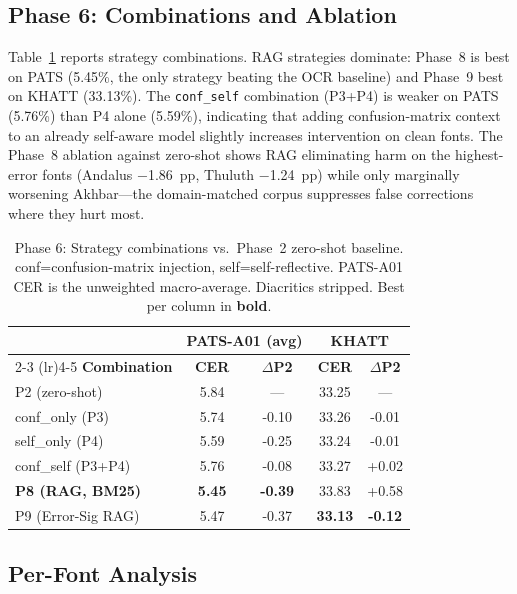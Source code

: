 \documentclass[conference]{IEEEtran}
\begin{document}
\subsection{Phase 6: Combinations and Ablation}

Table~\ref{tab:combos} reports strategy combinations. RAG strategies dominate:
Phase~8 is best on PATS (5.45\%, the only strategy beating the OCR baseline) and
Phase~9 best on KHATT (33.13\%). The \texttt{conf\_self} combination (P3+P4) is
weaker on PATS (5.76\%) than P4 alone (5.59\%), indicating that adding
confusion-matrix context to an already self-aware model slightly increases
intervention on clean fonts. The Phase~8 ablation against zero-shot shows RAG
eliminating harm on the highest-error fonts (Andalus $-$1.86~pp, Thuluth
$-$1.24~pp) while only marginally worsening Akhbar---the domain-matched corpus
suppresses false corrections where they hurt most.

\begin{table}[t]
\caption{Phase 6: Strategy combinations vs.\ Phase~2 zero-shot baseline.
conf=confusion-matrix injection, self=self-reflective. PATS-A01 CER is the
unweighted macro-average. Diacritics stripped. Best per column in \textbf{bold}.}
\label{tab:combos}
\begin{center}
\small
\begin{tabular}{lcccc}
\toprule
& \multicolumn{2}{c}{\textbf{PATS-A01 (avg)}} & \multicolumn{2}{c}{\textbf{KHATT}} \\
\cmidrule(lr){2-3} \cmidrule(lr){4-5}
\textbf{Combination} & \textbf{CER} & \textbf{$\Delta$P2} & \textbf{CER} & \textbf{$\Delta$P2} \\
\midrule
P2 (zero-shot)           & 5.84 & ---   & 33.25 & ---   \\
conf\_only (P3)          & 5.74 & -0.10 & 33.26 & -0.01 \\
self\_only (P4)          & 5.59 & -0.25 & 33.24 & -0.01 \\
conf\_self (P3+P4)       & 5.76 & -0.08 & 33.27 & +0.02 \\
\textbf{P8 (RAG, BM25)} & \textbf{5.45} & \textbf{-0.39} & 33.83 & +0.58 \\
P9 (Error-Sig RAG)       & 5.47 & -0.37 & \textbf{33.13} & \textbf{-0.12} \\
\bottomrule
\end{tabular}
\end{center}
\end{table}

\subsection{Per-Font Analysis}
\end{document}
